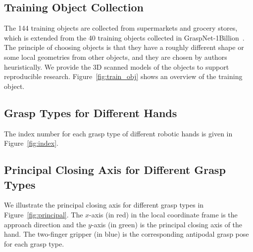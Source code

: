 \subsection*{Training Object Collection}
The 144 training objects are collected from supermarkets and grocery stores, which is extended from the 40 training objects collected in GraspNet-1Billion~\cite{fang2023robust}. The principle of choosing objects is that they have a roughly different shape or some local geometries from other objects, and they are chosen by authors heuristically. We provide the 3D scanned models of the objects to support reproducible research. Figure~\ref{fig:train_obj} shows an overview of the training object.

\subsection*{Grasp Types for Different Hands} The index number for each grasp type of different robotic hands is given in Figure~\ref{fig:index}.

\subsection*{Principal Closing Axis for Different Grasp Types} We illustrate the principal closing axis for different grasp types in Figure~\ref{fig:principal}. The $x$-axis (in red) in the local coordinate frame is the approach direction and the $y$-axis (in green) is the principal closing axis of the hand. The two-finger gripper (in blue) is the corresponding antipodal grasp pose for each grasp type.

